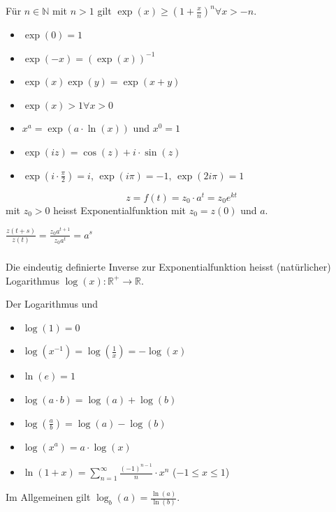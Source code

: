 Für $n \in \mathbb{N}$ mit $n>1$ gilt $\exp(x)\geq(1+\frac{x}{n})^n \forall x>-n$.

\begin{itemize}
    \item $\exp(0)=1$
    \item $\exp(-x)=(\exp(x))^{-1}$
    \item $\exp(x)\exp(y)=\exp(x+y)$
    \item $\exp(x) > 1 \forall x>0$
    \item $x^a = \exp(a \cdot \ln(x))$ und $x^0 = 1$
    \item $\exp(iz)=\cos(z)+i\cdot\sin(z)$
    \item $\exp(i \cdot \frac{\pi}{2})=i$, $\exp(i\pi)=-1$, $\exp(2i\pi)=1$
\end{itemize}

$$z=f(t)=z_0 \cdot a^t = z_0 e^{kt}$$
mit $z_0 > 0$ heisst Exponentialfunktion mit  $z_0 = z(0)$ und  $a$.

 $\frac{z(t+s)}{z(t)}=\frac{z_0 a^{t+1}}{z_0 a^t}=a^s$

\subsubsection{}
Die eindeutig definierte Inverse zur Exponentialfunktion heisst (natürlicher) Logarithmus
$\log(x) : \mathbb{R}^+ \rightarrow \mathbb{R}$.

Der Logarithmus  und 

\begin{itemize}
    \item $\log(1)=0$
    \item $\log(x^{-1})=\log(\frac{1}{x})=-\log(x)$
    \item $\ln(e)=1$
    \item $\log(a \cdot b)=\log(a)+\log(b)$
    \item $\log(\frac{a}{b})=\log(a) - \log(b)$
    \item $\log(x^a)=a \cdot \log(x)$
    \item $\ln(1+x)=\sum_{n=1}^{\infty} \frac{(-1)^{n-1}}{n}\cdot x^n$ ($-1 \leq x \leq 1$)
\end{itemize}

Im Allgemeinen gilt $\log_b(a)=\frac{\ln(a)}{\ln(b)}$.


